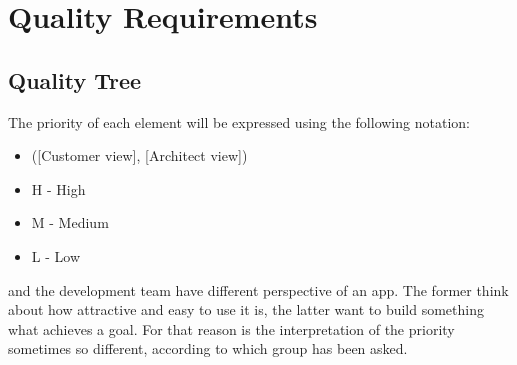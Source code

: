 \section{Quality Requirements}

\subsection{Quality Tree}

The priority of each element will be expressed using the following notation:

\begin{itemize}
    \item ([Customer view], [Architect view])
    \item H - High
    \item M - Medium
    \item L - Low
\end{itemize}

 and the development team have different perspective of an app. The former think about how attractive and easy to use
it is, the latter want to build something what achieves a goal. For that reason is the interpretation of the priority sometimes
so different, according to which group has been asked.

